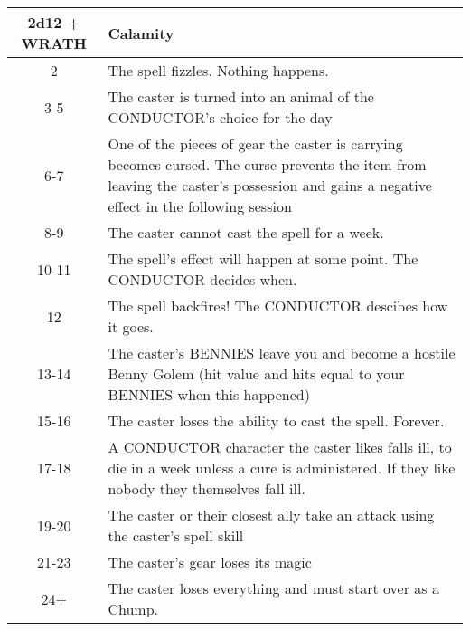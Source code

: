 \begin{adjustbox}{width=\textwidth, keepaspectratio, center}
    \begin{tabular}{|c|p{}|}
    \hline
    \textbf{2d12 + WRATH} & \textbf{Calamity} \\ \hline
    2 & The spell fizzles. Nothing happens. \\ \hline
    3-5 & The caster is turned into an animal of the CONDUCTOR's choice for the day \\ \hline
    6-7 & One of the pieces of gear the caster is carrying becomes cursed. The curse prevents the item from leaving the caster's possession and gains a negative effect in the following session \\ \hline
    8-9 & The caster cannot cast the spell for a week. \\ \hline
    10-11 & The spell's effect will happen at some point. The CONDUCTOR decides when. \\ \hline
    12 & The spell backfires! The CONDUCTOR descibes how it goes. \\ \hline
    13-14 & The caster's BENNIES leave you and become a hostile Benny Golem (hit value and hits equal to your BENNIES when this happened) \\ \hline
    15-16 & The caster loses the ability to cast the spell. Forever. \\ \hline
    17-18 & A CONDUCTOR character the caster likes falls ill, to die in a week unless a cure is administered. If they like nobody they themselves fall ill. \\ \hline
    19-20 & The caster or their closest ally take an attack using the caster's spell skill \\ \hline
    21-23 & The caster's gear loses its magic \\ \hline
    24+ & The caster loses everything and must start over as a Chump. \\ \hline
    \end{tabular}
\end{adjustbox}